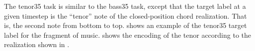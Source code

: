 
The \gls{tenor35} task is similar to the \gls{bass35} task,
except that the target label at a given timestep is the
``tenor'' note of the \gls{closed-position} chord
realization. That is, the second note from bottom to top.
 shows an example of the \gls{tenor35}
target label for the fragment of music. 
shows the encoding of the tenor according to the realization
shown in .


